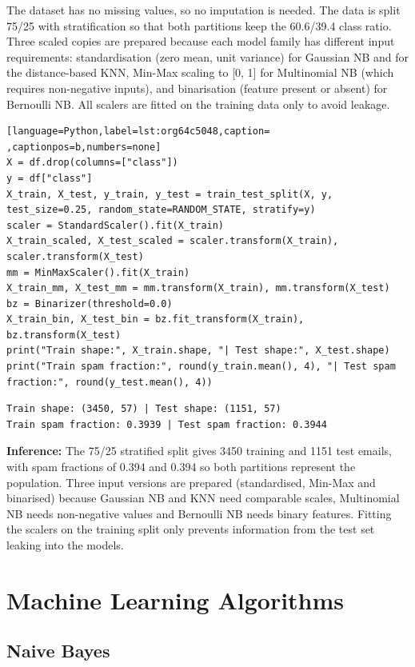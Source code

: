 \documentclass[11pt]{article}
\begin{document}
The dataset has no missing values, so no imputation is needed. The data is split 75/25 with
stratification so that both partitions keep the 60.6/39.4 class ratio. Three scaled copies
are prepared because each model family has different input requirements: standardisation
(zero mean, unit variance) for Gaussian NB and for the distance-based KNN, Min-Max scaling
to [0, 1] for Multinomial NB (which requires non-negative inputs), and binarisation (feature
present or absent) for Bernoulli NB. All scalers are fitted on the training data only to
avoid leakage.
\begin{lstlisting}[language=Python,label=lst:org64c5048,caption= ,captionpos=b,numbers=none]
X = df.drop(columns=["class"])
y = df["class"]
X_train, X_test, y_train, y_test = train_test_split(X, y, test_size=0.25, random_state=RANDOM_STATE, stratify=y)
scaler = StandardScaler().fit(X_train)
X_train_scaled, X_test_scaled = scaler.transform(X_train), scaler.transform(X_test)
mm = MinMaxScaler().fit(X_train)
X_train_mm, X_test_mm = mm.transform(X_train), mm.transform(X_test)
bz = Binarizer(threshold=0.0)
X_train_bin, X_test_bin = bz.fit_transform(X_train), bz.transform(X_test)
print("Train shape:", X_train.shape, "| Test shape:", X_test.shape)
print("Train spam fraction:", round(y_train.mean(), 4), "| Test spam fraction:", round(y_test.mean(), 4))
\end{lstlisting}

\begin{verbatim}
Train shape: (3450, 57) | Test shape: (1151, 57)
Train spam fraction: 0.3939 | Test spam fraction: 0.3944
\end{verbatim}


\textbf{Inference:} The 75/25 stratified split gives 3450 training and 1151 test emails, with spam fractions of
0.394 and 0.394 so both partitions represent the population. Three input versions are
prepared (standardised, Min-Max and binarised) because Gaussian NB and KNN need comparable
scales, Multinomial NB needs non-negative values and Bernoulli NB needs binary features.
Fitting the scalers on the training split only prevents information from the test set
leaking into the models.

\section*{Machine Learning Algorithms}
\label{sec:org472765f}


\subsection*{Naive Bayes}
\label{sec:org2fbcd69}
\end{document}
